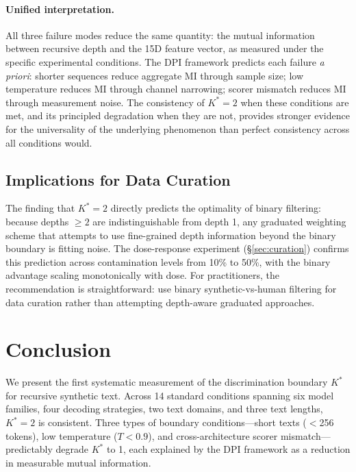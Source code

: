 \documentclass[11pt]{article}
\newcommand{\kstar}{K^{*}}
\begin{document}
\paragraph{Unified interpretation.} All three failure modes reduce the same quantity: the mutual information between recursive depth and the 15D feature vector, as measured under the specific experimental conditions. The DPI framework predicts each failure \emph{a priori}: shorter sequences reduce aggregate MI through sample size; low temperature reduces MI through channel narrowing; scorer mismatch reduces MI through measurement noise. The consistency of $\kstar = 2$ when these conditions are met, and its principled degradation when they are not, provides stronger evidence for the universality of the underlying phenomenon than perfect consistency across all conditions would.

\subsection{Implications for Data Curation}

The finding that $\kstar = 2$ directly predicts the optimality of binary filtering: because depths $\geq 2$ are indistinguishable from depth 1, any graduated weighting scheme that attempts to use fine-grained depth information beyond the binary boundary is fitting noise. The dose-response experiment (\S\ref{sec:curation}) confirms this prediction across contamination levels from 10\% to 50\%, with the binary advantage scaling monotonically with dose. For practitioners, the recommendation is straightforward: use binary synthetic-vs-human filtering for data curation rather than attempting depth-aware graduated approaches.

\section{Conclusion}

We present the first systematic measurement of the discrimination boundary $\kstar$ for recursive synthetic text. Across 14 standard conditions spanning six model families, four decoding strategies, two text domains, and three text lengths, $\kstar = 2$ is consistent. Three types of boundary conditions---short texts ($<$256 tokens), low temperature ($T < 0.9$), and cross-architecture scorer mismatch---predictably degrade $\kstar$ to 1, each explained by the DPI framework as a reduction in measurable mutual information.
\end{document}
